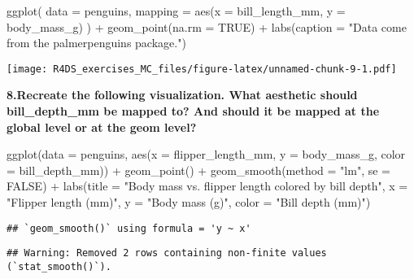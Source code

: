 \documentclass[
]{article}
\newenvironment{Shaded}{\begin{snugshade}}{\end{snugshade}}
\newcommand{\AttributeTok}[1]{\textcolor[rgb]{0.77,0.63,0.00}{#1}}
\newcommand{\ConstantTok}[1]{\textcolor[rgb]{0.00,0.00,0.00}{#1}}
\newcommand{\FunctionTok}[1]{\textcolor[rgb]{0.00,0.00,0.00}{#1}}
\newcommand{\NormalTok}[1]{#1}
\newcommand{\SpecialCharTok}[1]{\textcolor[rgb]{0.00,0.00,0.00}{#1}}
\newcommand{\StringTok}[1]{\textcolor[rgb]{0.31,0.60,0.02}{#1}}
\begin{document}
\begin{Shaded}
\begin{Highlighting}[]
\FunctionTok{ggplot}\NormalTok{(}
  \AttributeTok{data =}\NormalTok{ penguins,}
  \AttributeTok{mapping =} \FunctionTok{aes}\NormalTok{(}\AttributeTok{x =}\NormalTok{ bill\_length\_mm, }\AttributeTok{y =}\NormalTok{ body\_mass\_g)}
\NormalTok{) }\SpecialCharTok{+}
  \FunctionTok{geom\_point}\NormalTok{(}\AttributeTok{na.rm =} \ConstantTok{TRUE}\NormalTok{) }\SpecialCharTok{+}
  \FunctionTok{labs}\NormalTok{(}\AttributeTok{caption =} \StringTok{"Data come from the palmerpenguins package."}\NormalTok{)}
\end{Highlighting}
\end{Shaded}

\texttt{[image: R4DS\_exercises\_MC\_files/figure-latex/unnamed-chunk-9-1.pdf]}

\textbf{8.Recreate the following visualization. What aesthetic should
bill\_depth\_mm be mapped to? And should it be mapped at the global
level or at the geom level?}

\begin{Shaded}
\begin{Highlighting}[]
\FunctionTok{ggplot}\NormalTok{(}\AttributeTok{data =}\NormalTok{ penguins, }\FunctionTok{aes}\NormalTok{(}\AttributeTok{x =}\NormalTok{ flipper\_length\_mm, }\AttributeTok{y =}\NormalTok{ body\_mass\_g, }\AttributeTok{color =}\NormalTok{ bill\_depth\_mm)) }\SpecialCharTok{+}
  \FunctionTok{geom\_point}\NormalTok{() }\SpecialCharTok{+}
  \FunctionTok{geom\_smooth}\NormalTok{(}\AttributeTok{method =} \StringTok{"lm"}\NormalTok{, }\AttributeTok{se =} \ConstantTok{FALSE}\NormalTok{) }\SpecialCharTok{+}
  \FunctionTok{labs}\NormalTok{(}\AttributeTok{title =} \StringTok{"Body mass vs. flipper length colored by bill depth"}\NormalTok{,}
       \AttributeTok{x =} \StringTok{"Flipper length (mm)"}\NormalTok{,}
       \AttributeTok{y =} \StringTok{"Body mass (g)"}\NormalTok{,}
       \AttributeTok{color =} \StringTok{"Bill depth (mm)"}\NormalTok{)}
\end{Highlighting}
\end{Shaded}

\begin{verbatim}
## `geom_smooth()` using formula = 'y ~ x'
\end{verbatim}

\begin{verbatim}
## Warning: Removed 2 rows containing non-finite values (`stat_smooth()`).
\end{verbatim}
\end{document}
